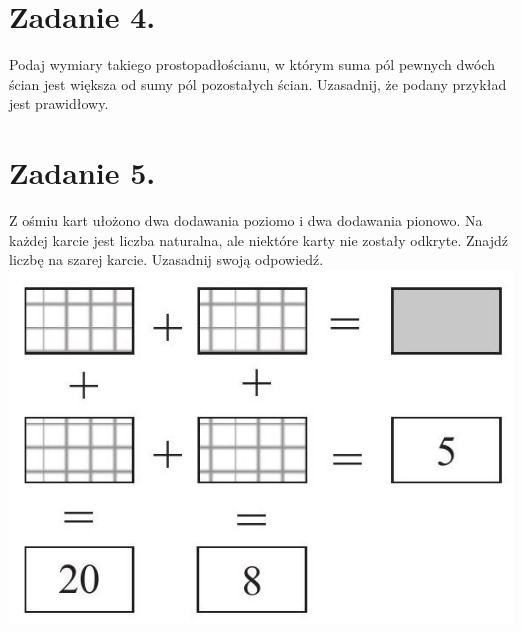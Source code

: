 \documentclass[10pt]{article}
\begin{document}
\section*{Zadanie 4.}
Podaj wymiary takiego prostopadłościanu, w którym suma pól pewnych dwóch ścian jest większa od sumy pól pozostałych ścian. Uzasadnij, że podany przykład jest prawidłowy.

\section*{Zadanie 5.}
Z ośmiu kart ułożono dwa dodawania poziomo i dwa dodawania pionowo. Na każdej karcie jest liczba naturalna, ale niektóre karty nie zostały odkryte. Znajdź liczbę na szarej karcie. Uzasadnij swoją odpowiedź.\\
\includegraphics[max width=\textwidth, center]{2024_11_21_a60e976091171712aedfg-1}
\end{document}
